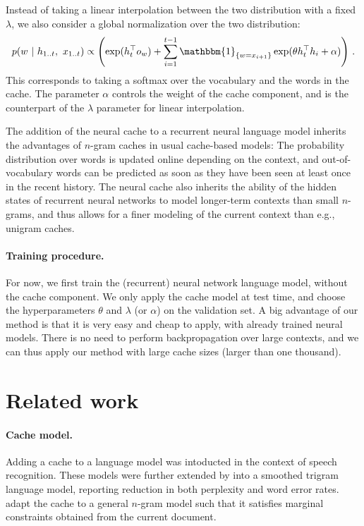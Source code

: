 \documentclass{article} \usepackage{iclr2017_conference,times}
\begin{document}
Instead of taking a linear interpolation between the two distribution
with a fixed $\lambda$, we also consider a global normalization over
the two distribution:
\begin{equation*}
p( w \ | \ h_{1..t}, \ x_{1..t}) \propto \left( \exp(h_t^{\top} o_w) + \sum_{i=1}^{t-1} \mathbbm{1}_{\left\{ w = x_{i+1} \right\}} \exp (\theta h_t^{\top} h_i + \alpha) \right)\,.
\end{equation*}
This corresponds to taking a softmax over the vocabulary and the words in the cache.
The parameter $\alpha$ controls the weight of the cache component, and is the counterpart of the $\lambda$ parameter for linear interpolation.

The addition of the neural cache to a recurrent neural language model
inherits the advantages of $n$-gram caches in usual cache-based
models: The probability distribution over words is updated online
depending on the context, and out-of-vocabulary words can be predicted
as soon as they have been seen at least once in the recent
history. The neural cache also inherits the ability of the hidden
states of recurrent neural networks to model longer-term contexts than
small $n$-grams, and thus allows for a finer modeling of the
current context than e.g., unigram caches.

\paragraph{Training procedure.}
For now, we first train the (recurrent) neural network language model,
without the cache component.  We only apply the cache model at test
time, and choose the hyperparameters $\theta$ and $\lambda$ (or
$\alpha$) on the validation set. A big advantage of our
method is that it is very easy and cheap to apply, with
already trained neural models.  There is no need to perform
backpropagation over large contexts, and we can thus apply our method
with large cache sizes (larger than one thousand).
 
\section{Related work}

\paragraph{Cache model.}
Adding a cache to a language model was intoducted in the context of speech
recognition\citep{kuhn1988speech,kupiec1989probabilistic,kuhn1990cache}.
These models were further extended by \citet{jelinek1991dynamic} into a smoothed
trigram language model, reporting reduction in both perplexity and word error rates.
\citet{della1992adaptive} adapt the cache to a general $n$-gram model
such that it satisfies marginal constraints obtained from the current document.
\end{document}
